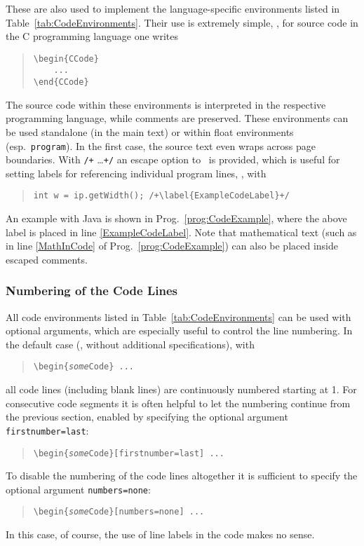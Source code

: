 These are also used to implement the language-specific environments listed in
Table~\ref{tab:CodeEnvironments}. Their use is extremely simple, \eg, for
source code in the C programming language one writes
%
\begin{quote}
    \begin{verbatim}
\begin{CCode}
    ... 
\end{CCode}
    \end{verbatim}
\end{quote}
%
The source code within these environments is interpreted in the respective
programming language, while comments are preserved. These environments can be
used standalone (in the main text) or within float environments (esp.\
\texttt{program}). In the first case, the source text even wraps across page
boundaries. With \verb!/+! \ldots \verb!+/! an escape option to \latex\ is
provided, which is useful for setting labels for referencing individual
program lines, \eg, with
%
\begin{quote}
    \verb!int w = ip.getWidth(); /+\label{ExampleCodeLabel}+/!
\end{quote}
%
An example with Java is shown in Prog.~\ref{prog:CodeExample}, where the
above label is placed in line \ref{ExampleCodeLabel}. Note that mathematical
text (such as in line \ref{MathInCode} of Prog.~\ref{prog:CodeExample}) can
also be placed inside escaped comments.


\subsubsection{Numbering of the Code Lines}

All code environments listed in Table~\ref{tab:CodeEnvironments} can be used
with optional arguments, which are especially useful to control the line
numbering. In the default case (\ie, without additional specifications), with
%
\begin{quote}
    \verb!\begin{!\texttt{\emph{some}Code}\verb!} ... !
\end{quote}
%
all code lines (including blank lines) are continuously numbered starting at
1. For consecutive code segments it is often helpful to let the numbering
continue from the previous section, enabled by specifying the optional argument
\texttt{firstnumber={\obnh}last}:
%
\begin{quote}
    \verb!\begin{!\texttt{\emph{some}Code}\verb!}[firstnumber=last] ... !
\end{quote}
%
To disable the numbering of the code lines altogether it is sufficient to
specify the optional argument
\texttt{numbers={\obnh}none}:
%
\begin{quote}
    \verb!\begin{!\texttt{\emph{some}Code}\verb!}[numbers=none] ... !
\end{quote}
%
In this case, of course, the use of line labels in the code makes no sense.


